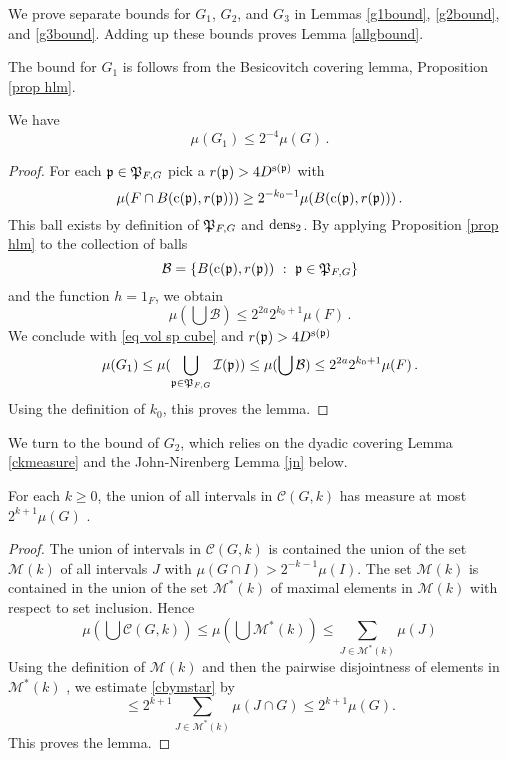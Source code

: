 We prove separate bounds for $G_1$, $G_2$, and $G_3$
in Lemmas  \ref{g1bound},
\ref{g2bound}, and \ref{g3bound}. Adding up these bounds proves Lemma \ref{allgbound}.

The bound for $G_1$ is follows from the Besicovitch covering lemma, Proposition \ref{prop hlm}.

\begin{lemma}\label{g1bound}
We have
\begin{equation}
    \mu(G_1)\le 2^{-4}\mu(G)\, .
\end{equation}
\end{lemma}
\begin{proof}
For each $\mathfrak p\in \mathfrak P_{F,G}$ pick a
$r(\mathfrak p)>4D^{\mathrm{s}(\mathfrak p)}$  with
$$
    {\mu(F\cap B(\mathrm{c}(\mathfrak p),r(\mathfrak p)))}\ge 2^{-k_0-1}{\mu(B(\mathrm{c}(\mathfrak p),r(\mathfrak p)))}\, .
$$
This ball exists by definition of $\mathfrak P_{F,G}$
and $\operatorname{\operatorname{dens}}_2$. By applying Proposition \ref{prop hlm} to the collection of balls
$$
    \mathcal{B} = \{B(\pc(\fp),r(\fp)) \ : \ \fp \in \fP_{F,G}\}
$$
and the function $h = 1_F$, we obtain
$$
    \mu(\bigcup \mathcal{B}) \le 2^{2a} 2^{k_0 +1} \mu(F)\,.
$$
We conclude  with \eqref{eq vol sp cube} and $r(\mathfrak p)>4D^{\mathrm{s}(\mathfrak p)}$
$$
    \mu(G_1)\le \mu(\bigcup_{\mathfrak p\in \mathfrak P_{F,G}} \mathcal{I}(\mathfrak p))
    \le \mu(\bigcup \mathcal{B})\le 2^{2a} 2^{k_0 + 1} \mu (F)\,.
$$
Using the definition of $k_0$, this proves the lemma.
\end{proof}


We turn to the bound of $G_2$, which relies on the dyadic covering Lemma \ref{ckmeasure} and the
John-Nirenberg Lemma \ref{jn} below.

\begin{lemma}\label{ckmeasure}
For  each $k\ge 0$, the union of all intervals
in $\mathcal{C}(G,k)$ has measure at most $2^{k+1} \mu(G)$ .
\end{lemma}
\begin{proof}
    The union of intervals  in $\mathcal{C}(G,k)$
is contained the union of the set $\mathcal{M}(k)$
of all intervals $J$ with
${\mu(G \cap I)} > 2^{-k-1}{\mu(I)}$.
The set $\mathcal{M}(k)$ is contained in the union of
the set $\mathcal{M}^*(k)$ of maximal elements in
$\mathcal{M}(k)$ with respect to set inclusion. Hence
\begin{equation}\label{cbymstar}
\mu (\bigcup \mathcal{C}(G,k))\le \mu (\bigcup \mathcal{M}^*(k))\le
\sum_{J\in \mathcal{M}^*(k)}\mu(J)
\end{equation}
Using the definition of $\mathcal{M}(k)$ and then
the  pairwise disjointness of elements in
$\mathcal{M}^*(k)$  ,
we estimate \eqref{cbymstar} by
\begin{equation}
\le
2^{k+1}\sum_{J\in \mathcal{M}^*(k)}\mu(J\cap G)
\le 2^{k+1}\mu(G).
\end{equation}
This proves the lemma.
\end{proof}




